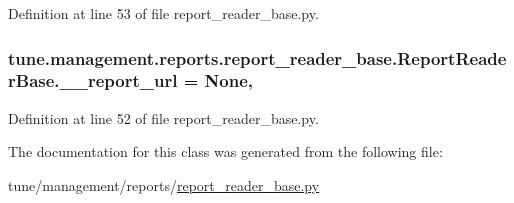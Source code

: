 Definition at line 53 of file report\-\_\-reader\-\_\-base.\-py.

\hypertarget{classtune_1_1management_1_1reports_1_1report__reader__base_1_1ReportReaderBase_a54ece2ab143966999222b2d9de8b9319}{
\subsubsection[{\-\_\-\-\_\-report\-\_\-url}]{\setlength{\rightskip}{0pt plus 5cm}tune.\-management.\-reports.\-report\-\_\-reader\-\_\-base.\-Report\-Reader\-Base.\-\_\-\-\_\-report\-\_\-url = None\hspace{0.3cm}{\ttfamily [static]}, {\ttfamily [private]}}}\label{classtune_1_1management_1_1reports_1_1report__reader__base_1_1ReportReaderBase_a54ece2ab143966999222b2d9de8b9319}


Definition at line 52 of file report\-\_\-reader\-\_\-base.\-py.



The documentation for this class was generated from the following file\-:\begin{DoxyCompactItemize}
\item 
tune/management/reports/\hyperlink{report__reader__base_8py}{report\-\_\-reader\-\_\-base.\-py}\end{DoxyCompactItemize}
